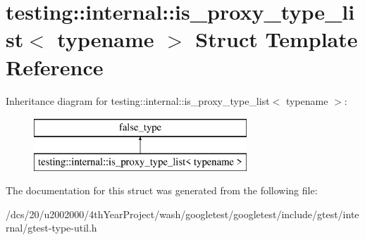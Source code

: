 \hypertarget{structtesting_1_1internal_1_1is__proxy__type__list}{}\section{testing\+:\+:internal\+:\+:is\+\_\+proxy\+\_\+type\+\_\+list$<$ typename $>$ Struct Template Reference}
\label{structtesting_1_1internal_1_1is__proxy__type__list}
Inheritance diagram for testing\+:\+:internal\+:\+:is\+\_\+proxy\+\_\+type\+\_\+list$<$ typename $>$\+:\begin{figure}[H]
\begin{center}
\leavevmode
\includegraphics[height=2.000000cm]{structtesting_1_1internal_1_1is__proxy__type__list}
\end{center}
\end{figure}


The documentation for this struct was generated from the following file\+:\begin{DoxyCompactItemize}
\item 
/dcs/20/u2002000/4th\+Year\+Project/wash/googletest/googletest/include/gtest/internal/gtest-\/type-\/util.\+h\end{DoxyCompactItemize}
